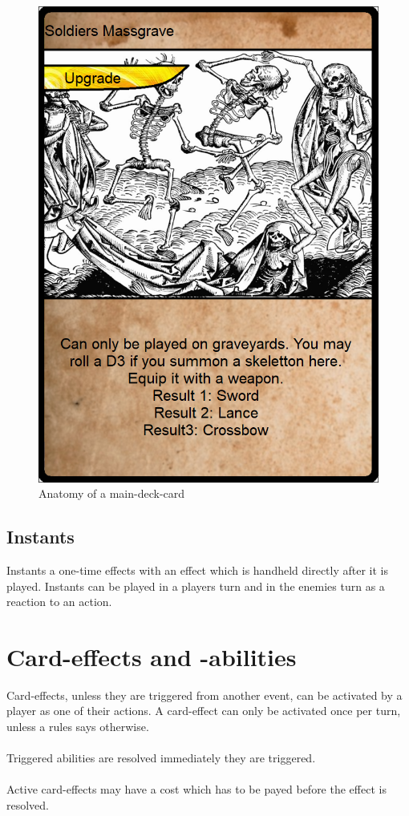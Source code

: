 \documentclass[a5paper,pagesize,10pt,bibtotoc,pointlessnumbers,
normalheadings,DIV=9,twoside=false]{scrbook}
\begin{document}
\begin{figure}[t]
\includegraphics[scale=1.0]{examplecard}
\centering
\caption{Anatomy of a main-deck-card}
\end{figure}

\subsection{Instants}
Instants a one-time effects with an effect which is handheld directly after it is played. Instants can be played in a players turn and in the enemies turn as a reaction to an action.\\

\newpage
\section{Card-effects and -abilities}
Card-effects, unless they are triggered from another event, can be activated by a player as one of their actions. A card-effect can only be activated once per turn, unless a rules says otherwise.\\
\\
Triggered abilities are resolved immediately they are triggered.\\
\\
Active card-effects may have a cost which has to be payed before the effect is resolved.
\end{document}
